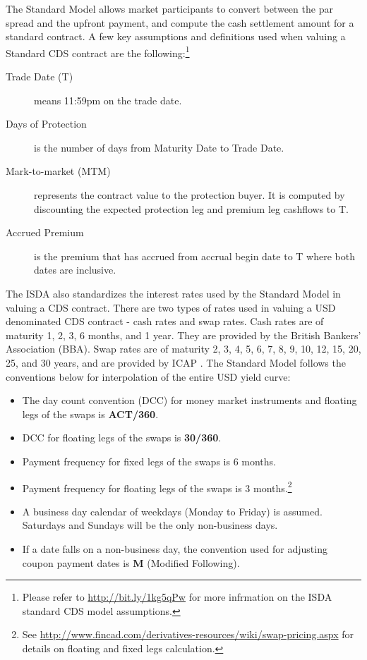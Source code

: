 \documentclass[a4paper]{article}
\begin{document}
The Standard Model allows market participants to convert between
the par spread and the upfront payment, and compute the cash
settlement amount for a standard contract. A few key assumptions and
definitions used when valuing a Standard CDS contract are the
following:\footnote{Please refer to \url{http://bit.ly/1kg5qPw} for
  more infrmation on the ISDA standard CDS model assumptions.}


\begin{description}
\item[Trade Date (T)] means 11:59pm on the trade date.
\item[Days of Protection] is the number of days
  from Maturity Date to Trade Date.
\item[Mark-to-market (MTM)] represents the contract value to the
  protection buyer. It is computed by discounting the expected
  protection leg and premium leg cashflows to T.
\item[Accrued Premium] is the premium that has accrued from accrual
  begin date to T where both dates are inclusive.
\end{description}


The ISDA also standardizes the interest rates used by the Standard
Model in valuing a CDS contract. There are two types of rates used in
valuing a USD denominated CDS contract - cash rates and swap
rates. Cash rates are of maturity 1, 2, 3, 6 months, and 1 year. They
are provided by the British Bankers' Association (BBA). Swap rates are
of maturity 2, 3, 4, 5, 6, 7, 8, 9, 10, 12, 15, 20, 25, and 30 years,
and are provided by ICAP \citep{rates}. The Standard Model follows the
conventions below for interpolation of the entire USD yield curve:
\begin{itemize}
\item The day count convention (DCC) for money market instruments and
  floating legs of the swaps is \textbf{ACT/360}.
\item DCC for floating legs of the swaps is \textbf{30/360}.
\item Payment frequency for fixed legs of the swaps is 6 months.
\item Payment frequency for floating legs of the swaps is 3
  months.\footnote{See
    \url{http://www.fincad.com/derivatives-resources/wiki/swap-pricing.aspx}
    for details on floating and fixed legs calculation.}
\item A business day calendar of weekdays (Monday to Friday) is
  assumed. Saturdays and Sundays will be the only non-business days.
\item If a date falls on a non-business day, the convention used for
  adjusting coupon payment dates is \textbf{M} (Modified Following).
\end{itemize}
\end{document}
